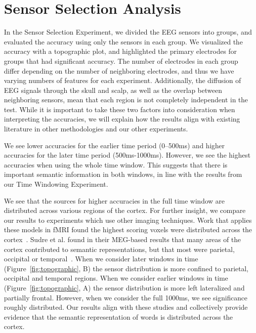\section{Sensor Selection Analysis}

In the Sensor Selection Experiment, we divided the EEG sensors into groups, and 
evaluated the \tvt accuracy using only the sensors in each group. We visualized 
the \tvt accuracy with a topographic plot, and highlighted the primary 
electrodes for groups that had significant accuracy. The number of electrodes 
in each group differ depending on the number of neighboring electrodes, and 
thus we have varying numbers of features for each \tvt experiment. 
Additionally, the diffusion of EEG signals through the skull and scalp, as well 
as the overlap between neighboring sensors, mean that each region is not 
completely independent in the \tvt test. While it is important to take these 
two factors into consideration when interpreting the accuracies, we will 
explain how the results align with existing literature in other methodologies 
and our other experiments.

We see lower \tvt accuracies for the earlier time period (0--500ms) and higher 
accuracies for the later time period (500ms-1000ms). However, we see the 
highest accuracies when using the whole time window. This suggests that there 
is important semantic information in both windows, in line with the results 
from our Time Windowing Experiment.

We see that the sources for higher accuracies in the full time window are 
distributed across various regions of the cortex. For further insight, we 
compare our results to experiments which use other imaging techniques. Work 
that applies these models in fMRI found the highest scoring voxels were 
distributed across the cortex~\cite{Mitchell2008, pereira2018toward}. Sudre et 
al. found in their MEG-based results that many areas of the cortex contributed 
to semantic representations, but that most were parietal, occipital or 
temporal~\cite{Sudre2012}. When we consider later windows in time 
(Figure~\ref{fig:topographic}, B) the sensor distribution is more confined to 
parietal, occipital and temporal regions. When we consider earlier windows in 
time (Figure~\ref{fig:topographic}, A) the sensor distribution is more left 
lateralized and partially frontal. However, when we consider the full 1000ms, 
we see significance roughly distributed.  Our results align with these studies 
and collectively provide evidence that the semantic representation of words is 
distributed across the cortex. 
